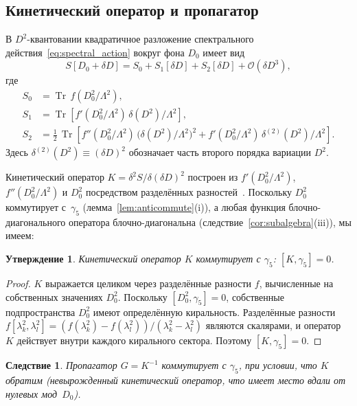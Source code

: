 \documentclass[12pt,a4paper]{article}
\newtheorem{corollary}[theorem]{Следствие}
\newtheorem{proposition}[theorem]{Утверждение}
\theoremstyle{definition}
\theoremstyle{remark}
\newcommand{\Tr}{\operatorname{Tr}}
\newcommand{\half}{\tfrac{1}{2}}
\newcommand{\Lam}{\Lambda}
\newcommand{\order}{\mathcal{O}}
\begin{document}
\subsection{Кинетический оператор и пропагатор}

В $D^2$-квантовании квадратичное разложение спектрального
действия~\eqref{eq:spectral_action} вокруг фона $D_0$ имеет вид
\begin{equation}\label{eq:S_quadratic}
  S[D_0 + \delta D] = S_0 + S_1[\delta D] + S_2[\delta D] + \order(\delta D^3),
\end{equation}
где
\begin{align}
  S_0 &= \Tr\,f(D_0^2/\Lam^2), \label{eq:S0}\\
  S_1 &= \Tr\!\left[f'(D_0^2/\Lam^2)\,\delta(D^2)/\Lam^2\right], \label{eq:S1}\\
  S_2 &= \half\,\Tr\!\left[f''(D_0^2/\Lam^2)\,\bigl(\delta(D^2)/\Lam^2\bigr)^2
         + f'(D_0^2/\Lam^2)\,\delta^{(2)}(D^2)/\Lam^2\right]. \label{eq:S2}
\end{align}
Здесь $\delta^{(2)}(D^2) \equiv (\delta D)^2$ обозначает часть второго
порядка вариации $D^2$.

Кинетический оператор $K = \delta^2 S / \delta(\delta D)^2$ построен из
$f'(D_0^2/\Lam^2)$, $f''(D_0^2/\Lam^2)$ и $D_0^2$ посредством
разделённых разностей~\cite{vanNuland:2021oneloop}.  Поскольку $D_0^2$
коммутирует с~$\gamma_5$ (лемма~\ref{lem:anticommute}(i)), а любая
функция блочно-диагонального оператора блочно-диагональна
(следствие~\ref{cor:subalgebra}(iii)), мы имеем:

\begin{proposition}\label{prop:kinetic_chiral}
Кинетический оператор $K$ коммутирует с $\gamma_5$:
$[K, \gamma_5] = 0$.
\end{proposition}

\begin{proof}
$K$ выражается целиком через разделённые разности $f$, вычисленные на
собственных значениях $D_0^2$.  Поскольку $[D_0^2, \gamma_5] = 0$,
собственные подпространства $D_0^2$ имеют определённую киральность.
Разделённые разности
$f[\lambda_k^2, \lambda_l^2] = (f(\lambda_k^2) - f(\lambda_l^2))/(\lambda_k^2 - \lambda_l^2)$
являются скалярами, и оператор $K$ действует внутри каждого кирального
сектора.  Поэтому $[K, \gamma_5] = 0$.
\end{proof}

\begin{corollary}\label{cor:propagator_chiral}
Пропагатор $G = K^{-1}$ коммутирует с $\gamma_5$, при условии, что
$K$ обратим (невырожденный кинетический оператор, что имеет место вдали
от нулевых мод~$D_0$).
\end{corollary}
\end{document}
